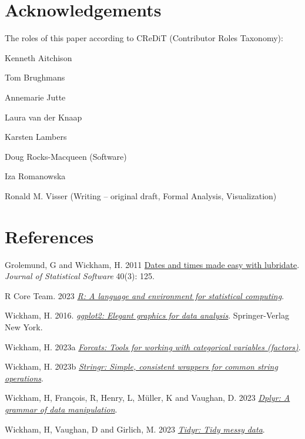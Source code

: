 \documentclass[
]{article}
\newlength{\cslhangindent}
\newlength{\cslentryspacingunit} %
\newenvironment{CSLReferences}[2] %
 {%
  \setlength{\parindent}{0pt}
  \ifodd #1
  \let\oldpar\par
  \def\par{\hangindent=\cslhangindent\oldpar}
  \fi
  \setlength{\parskip}{#2\cslentryspacingunit}
 }%
 {}
\begin{document}
\hypertarget{acknowledgements}{%
\section{Acknowledgements}\label{acknowledgements}}

The roles of this paper according to CReDiT (Contributor Roles
Taxonomy):

Kenneth Aitchison

Tom Brughmans

Annemarie Jutte

Laura van der Knaap

Karsten Lambers

Doug Rocks-Macqueen (Software)

Iza Romanowska

Ronald M. Visser (Writing -- original draft, Formal Analysis,
Visualization)

\hypertarget{references}{%
\section*{References}\label{references}}

\hypertarget{refs}{}
\begin{CSLReferences}{1}{0}
\leavevmode{}%
Grolemund, G and Wickham, H. 2011
\href{https://www.jstatsoft.org/v40/i03/}{Dates and times made easy with
lubridate}. \emph{Journal of Statistical Software} 40(3): 125.

\leavevmode{}%
R Core Team. 2023 \emph{\href{https://www.R-project.org/}{R: A language
and environment for statistical computing}}.

\leavevmode{}%
Wickham, H. 2016. \emph{\href{http://ggplot2.org}{ggplot2: Elegant
graphics for data analysis}}. Springer-Verlag New York.

\leavevmode{}%
Wickham, H. 2023a \emph{\href{https://forcats.tidyverse.org/}{Forcats:
Tools for working with categorical variables (factors)}}.

\leavevmode{}%
Wickham, H. 2023b \emph{\href{https://stringr.tidyverse.org}{Stringr:
Simple, consistent wrappers for common string operations}}.

\leavevmode{}%
Wickham, H, François, R, Henry, L, Müller, K and Vaughan, D. 2023
\emph{\href{https://dplyr.tidyverse.org}{Dplyr: A grammar of data
manipulation}}.

\leavevmode{}%
Wickham, H, Vaughan, D and Girlich, M. 2023
\emph{\href{https://tidyr.tidyverse.org}{Tidyr: Tidy messy data}}.

\end{CSLReferences}
\end{document}
